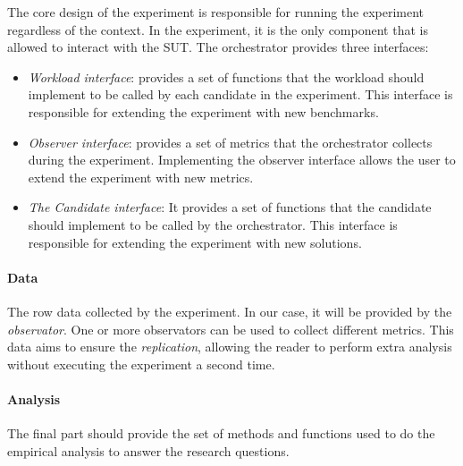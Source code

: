 The core design of the experiment is responsible for running the experiment regardless of the context.
In the experiment, it is the only component that is allowed to interact with the SUT.
The orchestrator provides three interfaces:
\begin{itemize}
    \item \emph{Workload interface}: provides a set of functions that the workload should implement to be called by each candidate in the experiment. This interface is responsible for extending the experiment with new benchmarks.
    \item \emph{Observer interface}: provides a set of metrics that the orchestrator collects during the experiment. Implementing the observer interface allows the user to extend the experiment with new metrics.
    \item \emph{The Candidate interface}: It provides a set of functions that the candidate should implement to be called by the orchestrator. This interface is responsible for extending the experiment with new solutions.
\end{itemize}

\paragraph{Data}
The row data collected by the experiment. In our case, it will be provided by the \emph{observator}. One or more observators can be used to collect different metrics. This data aims to ensure the \emph{replication}, allowing the reader to perform extra analysis without executing the experiment a second time.


\paragraph{Analysis}
The final part should provide the set of methods and functions used to do the empirical analysis to answer the research questions.












